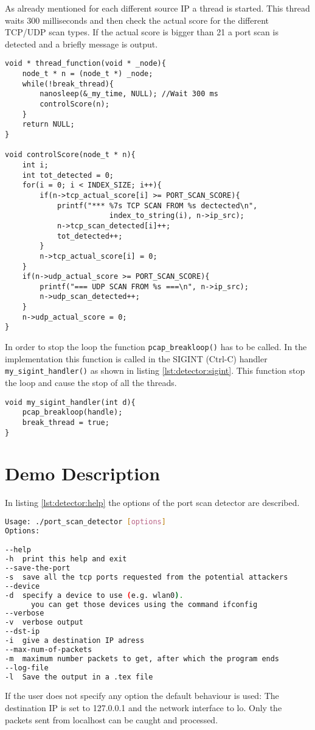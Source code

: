 As already mentioned for each different source IP a thread is started.
This thread waits 300 milliseconds and then check the actual score for
the different TCP/UDP scan types. If the actual score is bigger than
21 a port scan is detected and a briefly message is output. 
\begin{lstlisting}[style=MyC]
void * thread_function(void * _node){	
	node_t * n = (node_t *) _node;
	while(!break_thread){
		nanosleep(&_my_time, NULL); //Wait 300 ms
		controlScore(n);
	}
	return NULL;
}

void controlScore(node_t * n){
	int i;
	int tot_detected = 0;
	for(i = 0; i < INDEX_SIZE; i++){
		if(n->tcp_actual_score[i] >= PORT_SCAN_SCORE){
			printf("*** %7s TCP SCAN FROM %s dectected\n",
						index_to_string(i), n->ip_src);
			n->tcp_scan_detected[i]++;
			tot_detected++;
		}
		n->tcp_actual_score[i] = 0;
	}
	if(n->udp_actual_score >= PORT_SCAN_SCORE){
		printf("=== UDP SCAN FROM %s ===\n", n->ip_src);
		n->udp_scan_detected++;
	}
	n->udp_actual_score = 0;
}
\end{lstlisting}


In order to stop the loop the function \lstinline|pcap_breakloop()| has to be called.
In the implementation this function is called in the SIGINT (Ctrl-C) handler \lstinline|my_sigint_handler()| as shown
in listing \ref{lst:detector:sigint}. This function stop the loop and cause the stop of all the threads.
\begin{lstlisting}[style=MyC, caption=Handler that process the SIGINT signal., label=lst:detector:sigint]
void my_sigint_handler(int d){
	pcap_breakloop(handle);
	break_thread = true;
}
\end{lstlisting}



\section{Demo Description}
In listing \ref{lst:detector:help} the options of the port scan detector are described.
\begin{lstlisting}[frame=single, language=BASH, label=lst:detector:help, caption=Help page of the port scan detector.]
Usage: ./port_scan_detector [options]
Options:

--help
-h	print this help and exit
--save-the-port
-s	save all the tcp ports requested from the potential attackers
--device
-d	specify a device to use (e.g. wlan0). 
	  you can get those devices using the command ifconfig
--verbose
-v	verbose output
--dst-ip
-i	give a destination IP adress
--max-num-of-packets
-m	maximum number packets to get, after which the program ends
--log-file
-l	Save the output in a .tex file
\end{lstlisting}
If the user does not specify any option the default behaviour is used:
The destination IP is set to 127.0.0.1 and the network interface to lo. Only
the packets sent from localhost can be caught and processed.

